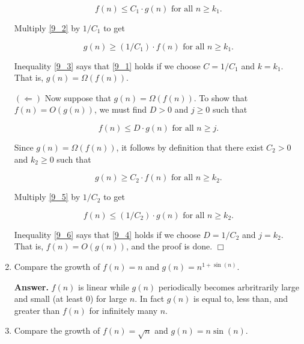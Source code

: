 \documentclass[9pt]{article}
\newcommand{\qed}{\hfill \ensuremath{\Box}}
\begin{document}
\begin{enumerate}
      \begin{equation} \label{9_2}
         f(n) \le C_1 \cdot g(n) \text{ for all } n \ge k_1.
      \end{equation}

      Multiply \eqref{9_2} by $1/C_1$ to get

      \begin{equation} \label{9_3}
         g(n) \ge (1/C_1) \cdot f(n) \text{ for all } n \ge k_1.
      \end{equation}

      Inequality \eqref{9_3} says that \eqref{9_1} holds if we choose
      $C = 1/C_1$ and $k = k_1$. That is, $g(n) = \Omega(f(n))$.

      $(\Leftarrow)$ Now suppose that $g(n) = \Omega(f(n))$. To show that
      $f(n) = O(g(n))$, we must find $D > 0$ and $j \ge 0$ such that

      \begin{equation} \label{9_4}
         f(n) \le D \cdot g(n) \text{ for all } n \ge j.
      \end{equation}

      Since $g(n) = \Omega(f(n))$, it follows by definition that there exist
      $C_2 > 0$ and $k_2 \ge 0$ such that 

      \begin{equation} \label{9_5}
         g(n) \ge C_2 \cdot f(n) \text{ for all } n \ge k_2.
      \end{equation}

      Multiply \eqref{9_5} by $1/C_2$ to get

      \begin{equation} \label{9_6}
         f(n) \le (1/C_2) \cdot g(n) \text{ for all } n \ge k_2.
      \end{equation}

      Inequality \eqref{9_6} says that \eqref{9_4} holds if we choose
      $D = 1/C_2$ and $j = k_2$. That is, $f(n) = O(g(n))$, and the proof is
      done. \qed
   \item Compare the growth of $f(n) = n$ and $g(n) = n^{1+\sin(n)}$.

      \textbf{Answer.} $f(n)$ is linear while $g(n)$ periodically becomes
      arbritrarily large and small (at least 0) for large $n$. In fact $g(n)$ is
      equal to, less than, and greater than $f(n)$ for infinitely many $n$.
   \item Compare the growth of $f(n) = \sqrt{n}$ and $g(n) = n\sin(n)$.


\end{enumerate}
\end{document}
